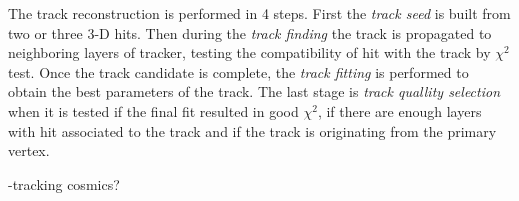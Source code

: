 The track reconstruction is performed in 4 steps. First the \textit{track seed} is built from two or three 3-D hits. Then during the \textit{track finding} the track is propagated to neighboring layers of tracker, testing the compatibility of hit with the track by $\chi^{2}$ test. Once the track candidate is complete, the \textit{track fitting} is performed to obtain the best parameters of the track. The last stage is \textit{track quallity selection} when it is tested if the final fit resulted in good $\chi^{2}$, if there are enough layers with hit associated to the track and if the track is originating from the primary vertex.

-tracking cosmics?
